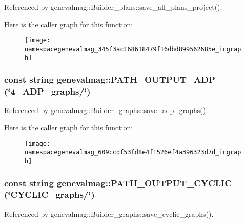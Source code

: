 Referenced by genevalmag::Builder\_\-plans::save\_\-all\_\-plans\_\-project().

Here is the caller graph for this function:\nopagebreak
\begin{figure}[H]
\begin{center}
\leavevmode
\texttt{[image: namespacegenevalmag\_345f3ac168618479f16dbd899562685e\_icgraph]}
\end{center}
\end{figure}
\hypertarget{namespacegenevalmag_609ccdf53fd8e4f1526ef4a396323d7d}{
\subsubsection[{PATH\_\-OUTPUT\_\-ADP}]{\setlength{\rightskip}{0pt plus 5cm}const string genevalmag::PATH\_\-OUTPUT\_\-ADP (\char`\"{}4\_\-ADP\_\-graphs/\char`\"{})}}
\label{namespacegenevalmag_609ccdf53fd8e4f1526ef4a396323d7d}




Referenced by genevalmag::Builder\_\-graphs::save\_\-adp\_\-graphs().

Here is the caller graph for this function:\nopagebreak
\begin{figure}[H]
\begin{center}
\leavevmode
\texttt{[image: namespacegenevalmag\_609ccdf53fd8e4f1526ef4a396323d7d\_icgraph]}
\end{center}
\end{figure}
\hypertarget{namespacegenevalmag_401d9cc13c246072071c64015b3716c8}{
\subsubsection[{PATH\_\-OUTPUT\_\-CYCLIC}]{\setlength{\rightskip}{0pt plus 5cm}const string genevalmag::PATH\_\-OUTPUT\_\-CYCLIC (\char`\"{}CYCLIC\_\-graphs/\char`\"{})}}
\label{namespacegenevalmag_401d9cc13c246072071c64015b3716c8}




Referenced by genevalmag::Builder\_\-graphs::save\_\-cyclic\_\-graphs().

